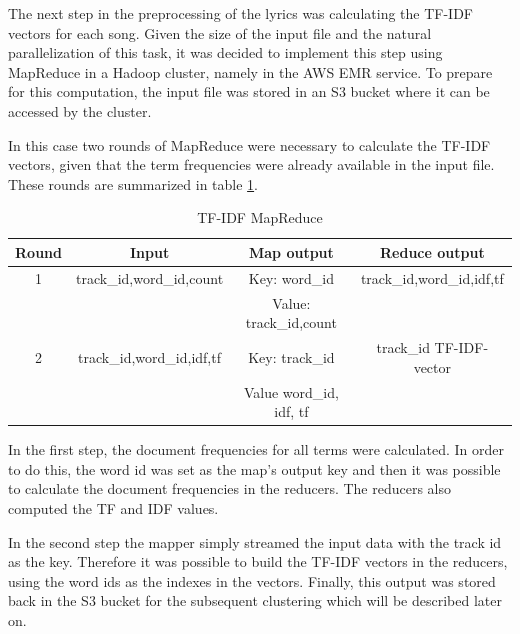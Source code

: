\documentclass[10pt,a4paper]{scrartcl}
\begin{document}
    The next step in the preprocessing of the lyrics was calculating the
    TF-IDF vectors for each song. Given the size of the input file and the
    natural parallelization of this task, it was decided to implement this
    step using MapReduce in a Hadoop cluster, namely in the AWS EMR service.
    To prepare for this computation, the input file was stored in an S3 bucket
    where it can be accessed by the cluster.
    
    In this case two rounds of MapReduce were necessary to calculate
    the TF-IDF vectors, given that the term frequencies were already available in
    the input file.
    These rounds are summarized in table \ref{tab:mapreduce-tfidf}.
    
    \begin{table}
	    \centering
	    \caption{TF-IDF MapReduce}
	    \begin{tabular}{|c||c||c||c|}
	      \hline
	      Round & Input & Map output & Reduce output \\
	      \hline
	      1 & track\_id,word\_id,count & Key: word\_id &
	      track\_id,word\_id,idf,tf\\
	        &                          & Value: track\_id,count & \\
	      \hline
	      2 & track\_id,word\_id,idf,tf & Key: track\_id & track\_id
	      TF-IDF-vector\\
	        &                           & Value word\_id, idf, tf & \\
	      \hline
      \end{tabular}
      \label{tab:mapreduce-tfidf}
    \end{table}
    
    In the first step, the document frequencies for all terms were calculated. In
    order to do this, the word id was set as the map's output key and then
    it was possible to calculate the document frequencies in the reducers.
    The reducers also computed the TF and IDF values.
    
    
    In the second step the mapper simply streamed the input data with the track
    id as the key. Therefore it was possible to build the TF-IDF vectors in the
    reducers, using the word ids as the indexes in the vectors.
    Finally, this output was stored back in the S3 bucket for the subsequent
    clustering which will be described later on.
  
\end{document}
